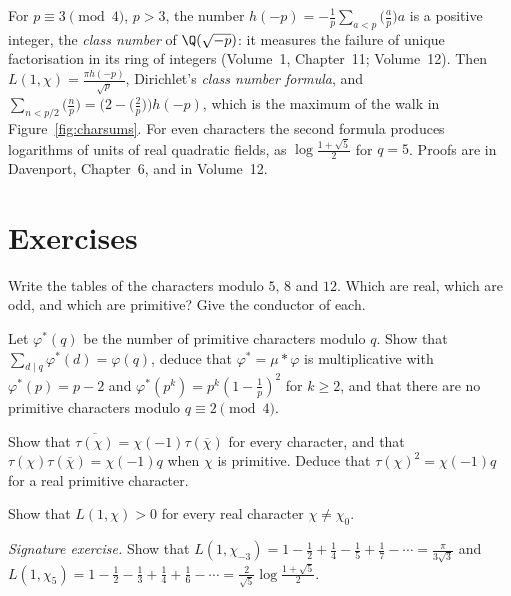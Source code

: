 \begin{remark}
For $p\equiv3\pmod4$, $p>3$, the number $h(-p)=-\frac1p\sum_{a<p}\bigl(\frac ap\bigr)a$ is a positive integer, the \emph{class number} of $\Q(\sqrt{-p})$: it
measures the failure of unique factorisation in its ring of integers (Volume~1, Chapter~11; Volume~12). Then $L(1,\chi)=\frac{\pi h(-p)}{\sqrt p}$, Dirichlet's
\emph{class number formula}, and $\sum_{n<p/2}\bigl(\frac np\bigr)=\bigl(2-\bigl(\frac2p\bigr)\bigr)h(-p)$, which is the maximum of the walk in Figure~\ref{fig:charsums}. For
even characters the second formula produces logarithms of units of real quadratic fields, as $\log\frac{1+\sqrt5}2$ for $q=5$. Proofs are in
Davenport, Chapter~6, and in Volume~12.
\end{remark}

\section{Exercises}

\begin{exercise}[$\star$]\label{ex:chartables}
Write the tables of the characters modulo $5$, $8$ and $12$. Which are real, which are odd, and which are primitive? Give the conductor of
each.
\end{exercise}

\begin{exercise}[$\star\star$]\label{ex:primcount}
Let $\varphi^*(q)$ be the number of primitive characters modulo $q$. Show that $\sum_{d\mid q}\varphi^*(d)=\varphi(q)$, deduce that $\varphi^*=\mu*\varphi$ is multiplicative
with $\varphi^*(p)=p-2$ and $\varphi^*(p^k)=p^k(1-\frac1p)^2$ for $k\ge2$, and that there are no primitive characters modulo $q\equiv2\pmod4$.
\end{exercise}

\begin{exercise}[$\star\star$]\label{ex:gausssquare}
Show that $\overline{\tau(\chi)}=\chi(-1)\tau(\overline\chi)$ for every character, and that $\tau(\chi)\tau(\overline\chi)=\chi(-1)q$ when $\chi$ is primitive. Deduce that
$\tau(\chi)^2=\chi(-1)q$ for a real primitive character.
\end{exercise}

\begin{exercise}[$\star$]\label{ex:lpositive}
Show that $L(1,\chi)>0$ for every real character $\chi\ne\chi_0$.
\end{exercise}

\begin{exercise}[$\star\star$]\label{ex:l1values}
\emph{Signature exercise.} Show that $L(1,\chi_{-3})=1-\frac12+\frac14-\frac15+\frac17-\cdots=\frac\pi{3\sqrt3}$ and
$L(1,\chi_5)=1-\frac12-\frac13+\frac14+\frac16-\cdots=\frac2{\sqrt5}\log\frac{1+\sqrt5}2$.
\end{exercise}


